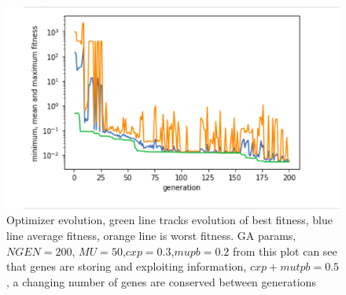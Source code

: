 \begin{figure}
    \centering
    \includegraphics[scale=0.7]{figures/optimizer_internal_validation}
    \caption[Optimizer error over generations]{Optimizer evolution, green line tracks evolution of best fitness, blue line average fitness, orange line is worst fitness. GA params, $NGEN=200$, $MU=50$,$cxp=0.3$,$mupb=0.2$ from this plot can see that genes are storing and exploiting information, $cxp+mutpb=0.5$, a changing number of genes are conserved between generations }
    \label{fig:my_label}
\end{figure}


